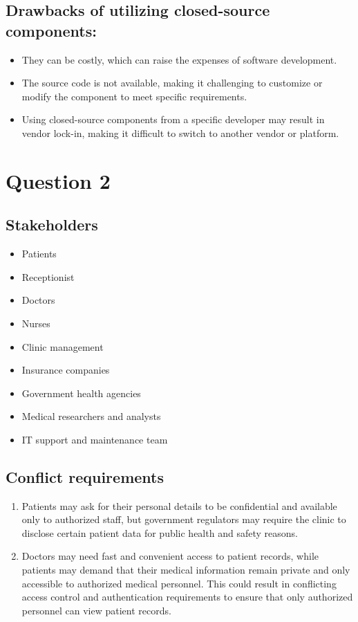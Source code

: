 \documentclass{article}
\begin{document}
\subsection*{Drawbacks of utilizing closed-source components:}
\begin{itemize}

	\item They can be costly, which can raise the expenses of software development.
	\item The source code is not available, making it challenging to customize or modify the component to meet specific requirements.
	\item Using closed-source components from a specific developer may result in vendor lock-in, making it difficult to switch to another vendor or platform.
\end{itemize}

\section*{Question 2}%
\subsection*{Stakeholders}%

\begin{itemize}
	\item Patients
	\item Receptionist
	\item Doctors
	\item Nurses
	\item Clinic management
	\item Insurance companies
	\item Government health agencies
	\item Medical researchers and analysts
	\item IT support and maintenance team
\end{itemize}


\subsection*{Conflict requirements}
\begin{enumerate}
	\item Patients may ask for their personal details to be confidential and available only to authorized staff, but government regulators may require the clinic to disclose certain patient data for public health and safety reasons.
	\item Doctors may need fast and convenient access to patient records, while patients may demand that their medical information remain private and only accessible to authorized medical personnel. This could result in conflicting access control and authentication requirements to ensure that only authorized personnel can view patient records.
\end{enumerate}
\end{document}
